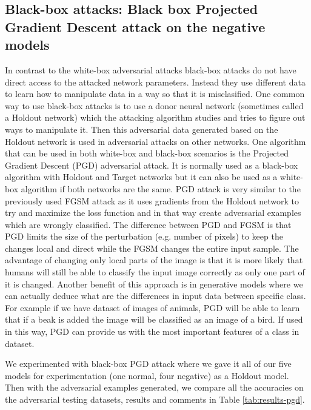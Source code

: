 \documentclass[b5paper]{book}
\begin{document}
\subsection{Black-box attacks: Black box Projected Gradient Descent attack on the negative models}

In contrast to the white-box adversarial attacks black-box attacks do not have direct access to the attacked network parameters. Instead they use different data to learn how to manipulate data in a way so that it is misclasified. One common way to use black-box attacks is to use a donor neural network (sometimes called a Holdout network) which the attacking algorithm studies and tries to figure out ways to manipulate it. Then this adversarial data generated based on the Holdout network is used in adversarial attacks on other networks. One algorithm that can be used in both white-box and black-box scenarios is the Projected Gradient Descent (PGD) adversarial attack. It is normally used as a black-box algorithm with Holdout and Target networks but it can also be used as a white-box algorithm if both networks are the same. PGD attack is very similar to the previously used FGSM attack as it uses gradients from the Holdout network to try and maximize the loss function and in that way create adversarial examples which are wrongly classified. The difference between PGD and FGSM is that PGD limits the size of the perturbation (e.g. number of pixels) to keep the changes local and direct while the FGSM changes the entire input sample. The advantage of changing only local parts of the image is that it is more likely that humans will still be able to classify the input image correctly as only one part of it is changed. Another benefit of this approach is in generative models where we can actually deduce what are the differences in input data between specific class. For example if we have dataset of images of animals, PGD will be able to learn that if a beak is added the image will be classified as an image of a bird. If used in this way, PGD can provide us with the most important features of a class in dataset.

We experimented with black-box PGD attack where we gave it all of our five models for experimentation (one normal, four negative) as a Holdout model. Then with the adversarial examples generated, we compare all the accuracies on the adversarial testing datasets, results and comments in Table \ref{tab:results-pgd}.
\end{document}
